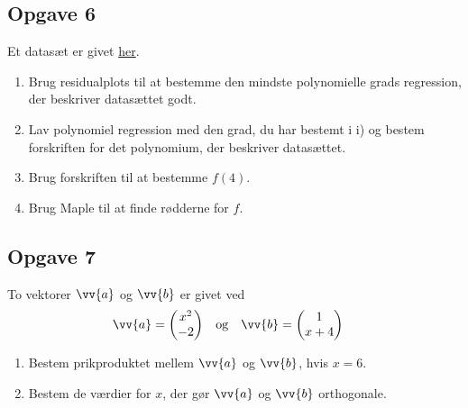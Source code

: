 \documentclass[12pt]{article}
\begin{document}
\subsection*{Opgave 6}
	Et datasæt er givet \href{https://github.com/ChristianJLex/TeachingNotes/raw/master/2023-2024/Data og lign/poly_opgave1.xlsx}{\color{blue!60} her}.
	\begin{enumerate}[label=\roman*)]
		\item Brug residualplots til at bestemme den mindste polynomielle grads regression, 
		der beskriver datasættet godt. 
		\item Lav polynomiel regression med den grad, du har bestemt i i) og bestem 
		forskriften for det polynomium, der beskriver datasættet.
		\item Brug forskriften til at bestemme $f(4)$.
		\item Brug Maple til at finde rødderne for $f$.
	\end{enumerate}

\subsection*{Opgave 7}

To vektorer $\vv{a}$ og $\vv{b}$ er givet ved
\begin{align*}
	&\vv{a} =	
	\begin{pmatrix}
		x^2 \\ -2
	\end{pmatrix}
	&
	&\textnormal{og}
	&
	&\vv{b} =
	\begin{pmatrix}
		1 \\ x+4
	\end{pmatrix}
\end{align*}

\begin{enumerate}[label=\roman*)]
	\item Bestem prikproduktet mellem $\vv{a}$ og $\vv{b}$, hvis $x = 6$.
	\item Bestem de værdier for $x$, der gør $\vv{a}$ og $\vv{b}$ orthogonale. 
\end{enumerate}
\end{document}
